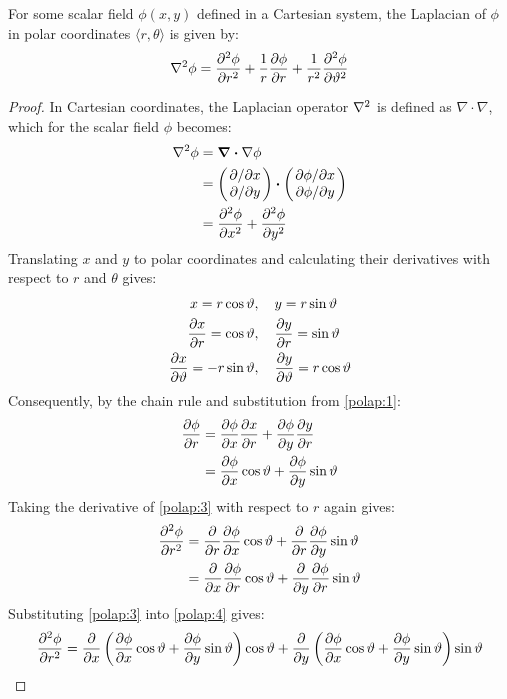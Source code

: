 \begin{lemma}
	For some scalar field $\phi(x,y)$ defined in a Cartesian system, the Laplacian of $\phi$ in polar coordinates $\langle r,\theta\rangle$ is given by:
	$$
	\laplacian{\phi}=\pdv[2]{\phi}{r}+\frac{1}{r}\pdv{\phi}{r}+\frac{1}{r^2}\pdv[2]{\phi}{\theta}
	$$
\end{lemma}
\begin{proof}
	In Cartesian coordinates, the Laplacian operator $\laplacian$ is defined as $\nabla\cdot\nabla$, which for the scalar field $\phi$ becomes:
	\begin{align*}
		\notag\laplacian{\phi}&=\div\nabla\phi\\
							  &=\begin{pmatrix}\pdv*{x}\\\pdv*{y}\end{pmatrix}\vdot\begin{pmatrix}\pdv*{\phi}{x}\\\pdv*{\phi}{y}\end{pmatrix}\\
							  &=\pdv[2]{\phi}{x}+\pdv[2]{\phi}{y}
	\end{align*}
	Translating $x$ and $y$ to polar coordinates and calculating their derivatives with respect to $r$ and $\theta$ gives:
	\begin{align}
		\notag x=r\cos\vartheta&,\quad y=r\sin\vartheta\\
		\label{polap:1}\pdv{x}{r}=\cos\vartheta&,\quad\pdv{y}{r}=\sin\vartheta\\
		\label{polap:2}\pdv{x}{\vartheta}=-r\sin\vartheta&,\quad\pdv{y}{\vartheta}=r\cos\vartheta
	\end{align}
	Consequently, by the chain rule and substitution from \ref{polap:1}:
	\begin{align}
		\notag\pdv{\phi}{r}&=\pdv{\phi}{x}\pdv{x}{r}+\pdv{\phi}{y}\pdv{y}{r}\\
		\label{polap:3}&=\pdv{\phi}{x}\cos\vartheta+\pdv{\phi}{y}\sin\vartheta
	\end{align}
	Taking the derivative of \ref{polap:3} with respect to $r$ again gives:
	\begin{align}
		\notag\pdv[2]{\phi}{r}&=\pdv{}{r}\pdv{\phi}{x}\cos\vartheta+\pdv{}{r}\pdv{\phi}{y}\sin\vartheta\\
		\label{polap:4}&=\pdv{}{x}\pdv{\phi}{r}\cos\vartheta+\pdv{}{y}\pdv{\phi}{r}\sin\vartheta
	\end{align}
	Substituting \ref{polap:3} into \ref{polap:4} gives:
	\begin{align}
		\notag\pdv[2]{\phi}{r}&=\pdv{}{x}\left(\pdv{\phi}{x}\cos\theta+\pdv{\phi}{y}\sin\theta\right)\cos\theta+\pdv{}{y}\left(\pdv{\phi}{x}\cos\theta+\pdv{\phi}{y}\sin\theta\right)\sin\theta\\

\end{align}
\end{proof}
